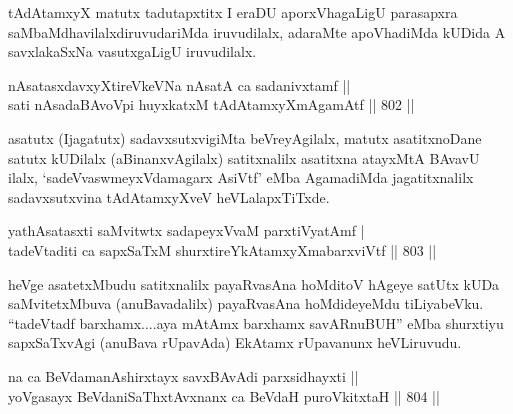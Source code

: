 \begin{artha}
tAdAtamxyX matutx tadutapxtitx I eraDU aporxVhagaLigU parasapxra saMbaMdhavilalxdiruvudariMda iruvudilalx, adaraMte apoVhadiMda kUDida A savxlakaSxNa vasutxgaLigU iruvudilalx.
\end{artha}


\begin{shl}
\footnotemark[1]nAsatasxdavxyXtireVkeVNa nAsatA ca sadanivxtamf ||  \\
sati nAsadaBAvoV\s pi huyxkatxM tAdAtamxyXmAgamAtf \hfill||  802 ||  
\end{shl}

\begin{artha}
asatutx (Ijagatutx) sadavxsutxvigiMta beVreyAgilalx, matutx asatitxnoDane satutx kUDilalx (aBinanxvAgilalx) satitxnalilx asatitxna atayxMtA BAvavU ilalx, `sadeVvaswmeyxVdamagarx AsiVtf' eMba AgamadiMda jagatitxnalilx sadavxsutxvina tAdAtamxyXveV heVLalapxTiTxde.
\end{artha}

\begin{shl}
yathA\s satasxti saMvitwtx sadapeyxVvaM parxtiVyatAmf | \\
tadeVtaditi ca sapxSaTxM shurxtireYkAtamxyXmabarxviVtf \hfill||  803 ||  
\end{shl}

\begin{artha}
heVge asatetxMbudu satitxnalilx payaRvasAna hoMditoV hAgeye satUtx kUDa saMvitetxMbuva (anuBavadalilx) payaRvasAna hoMdideyeMdu tiLiyabeVku. ``tadeVtadf barxhamx....aya mAtAmx barxhamx savARnuBUH'' eMba shurxtiyu sapxSaTxvAgi (anuBava rUpavAda) EkAtamx rUpavanunx heVLiruvudu.
\end{artha}

\begin{shl}
na ca BeVdamanAshirxtayx savxBAvAdi parxsidhayxti ||  \\
yoVgasayx BeVdaniSaThxtAvxnanx ca BeVdaH puroVkitxtaH \hfill||  804 ||  
\end{shl}

